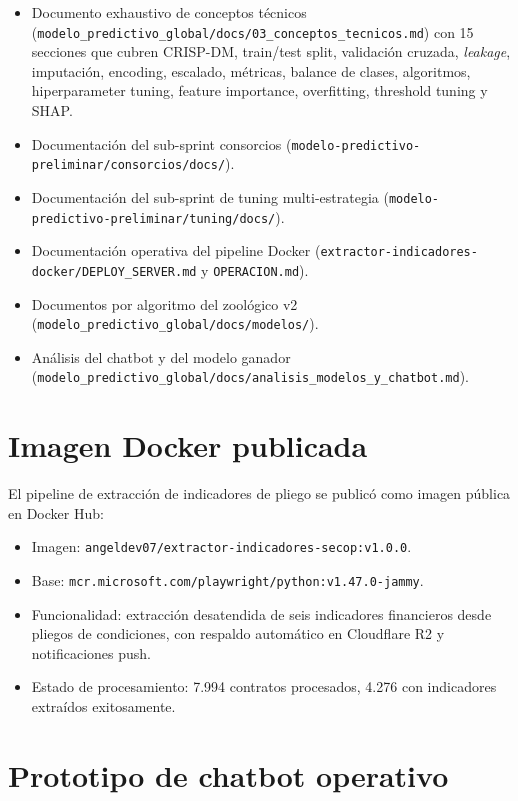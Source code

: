 \documentclass[12pt,letterpaper,oneside]{report}
\begin{document}
\begin{itemize}
    \item Documento exhaustivo de conceptos técnicos
    (\texttt{modelo\_predictivo\_global/docs/03\_conceptos\_tecnicos.md}) con
    15 secciones que cubren CRISP-DM, train/test split, validación cruzada,
    \emph{leakage}, imputación, encoding, escalado, métricas, balance de
    clases, algoritmos, hiperparameter tuning, feature importance,
    overfitting, threshold tuning y SHAP.
    \item Documentación del sub-sprint consorcios
    (\texttt{modelo-predictivo-preliminar/consorcios/docs/}).
    \item Documentación del sub-sprint de tuning multi-estrategia
    (\texttt{modelo-predictivo-preliminar/tuning/docs/}).
    \item Documentación operativa del pipeline Docker
    (\texttt{extractor-indicadores-docker/DEPLOY\_SERVER.md} y
    \texttt{OPERACION.md}).
    \item Documentos por algoritmo del zoológico v2
    (\texttt{modelo\_predictivo\_global/docs/modelos/}).
    \item Análisis del chatbot y del modelo ganador
    (\texttt{modelo\_predictivo\_global/docs/analisis\_modelos\_y\_chatbot.md}).
\end{itemize}

\section{Imagen Docker publicada}

El pipeline de extracción de indicadores de pliego se publicó como imagen
pública en Docker Hub:

\begin{itemize}
    \item Imagen: \texttt{angeldev07/extractor-indicadores-secop:v1.0.0}.
    \item Base: \texttt{mcr.microsoft.com/playwright/python:v1.47.0-jammy}.
    \item Funcionalidad: extracción desatendida de seis indicadores
    financieros desde pliegos de condiciones, con respaldo automático en
    Cloudflare R2 y notificaciones push.
    \item Estado de procesamiento: 7.994 contratos procesados, 4.276 con
    indicadores extraídos exitosamente.
\end{itemize}

\section{Prototipo de chatbot operativo}
\end{document}
